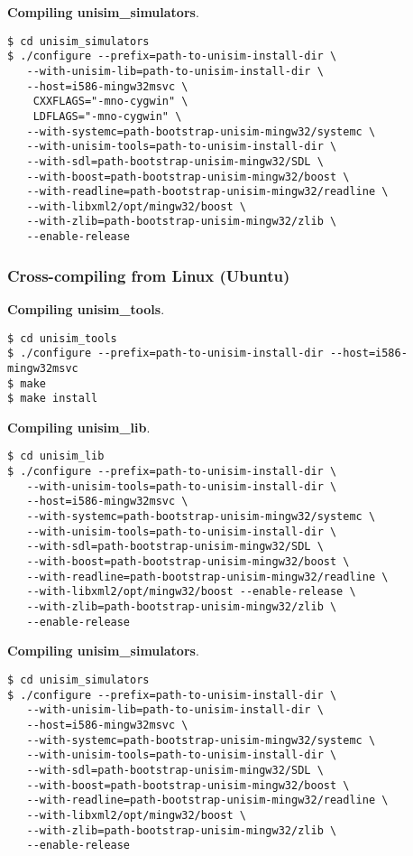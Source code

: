 \noindent \textbf{Compiling unisim\_simulators}.

\begin{verbatim}
$ cd unisim_simulators
$ ./configure --prefix=path-to-unisim-install-dir \
   --with-unisim-lib=path-to-unisim-install-dir \
   --host=i586-mingw32msvc \
    CXXFLAGS="-mno-cygwin" \
    LDFLAGS="-mno-cygwin" \
   --with-systemc=path-bootstrap-unisim-mingw32/systemc \
   --with-unisim-tools=path-to-unisim-install-dir \
   --with-sdl=path-bootstrap-unisim-mingw32/SDL \
   --with-boost=path-bootstrap-unisim-mingw32/boost \
   --with-readline=path-bootstrap-unisim-mingw32/readline \
   --with-libxml2/opt/mingw32/boost \
   --with-zlib=path-bootstrap-unisim-mingw32/zlib \
   --enable-release
\end{verbatim}

\subsubsection{Cross-compiling from Linux (Ubuntu)}

\noindent \textbf{Compiling unisim\_tools}.

\begin{verbatim}
$ cd unisim_tools
$ ./configure --prefix=path-to-unisim-install-dir --host=i586-mingw32msvc
$ make
$ make install
\end{verbatim}

\noindent \textbf{Compiling unisim\_lib}.

\begin{verbatim}
$ cd unisim_lib
$ ./configure --prefix=path-to-unisim-install-dir \
   --with-unisim-tools=path-to-unisim-install-dir \
   --host=i586-mingw32msvc \
   --with-systemc=path-bootstrap-unisim-mingw32/systemc \
   --with-unisim-tools=path-to-unisim-install-dir \
   --with-sdl=path-bootstrap-unisim-mingw32/SDL \
   --with-boost=path-bootstrap-unisim-mingw32/boost \
   --with-readline=path-bootstrap-unisim-mingw32/readline \
   --with-libxml2/opt/mingw32/boost --enable-release \
   --with-zlib=path-bootstrap-unisim-mingw32/zlib \
   --enable-release
\end{verbatim}

\noindent \textbf{Compiling unisim\_simulators}.

\begin{verbatim}
$ cd unisim_simulators
$ ./configure --prefix=path-to-unisim-install-dir \
   --with-unisim-lib=path-to-unisim-install-dir \
   --host=i586-mingw32msvc \
   --with-systemc=path-bootstrap-unisim-mingw32/systemc \
   --with-unisim-tools=path-to-unisim-install-dir \
   --with-sdl=path-bootstrap-unisim-mingw32/SDL \
   --with-boost=path-bootstrap-unisim-mingw32/boost \
   --with-readline=path-bootstrap-unisim-mingw32/readline \
   --with-libxml2/opt/mingw32/boost \
   --with-zlib=path-bootstrap-unisim-mingw32/zlib \
   --enable-release
\end{verbatim}
